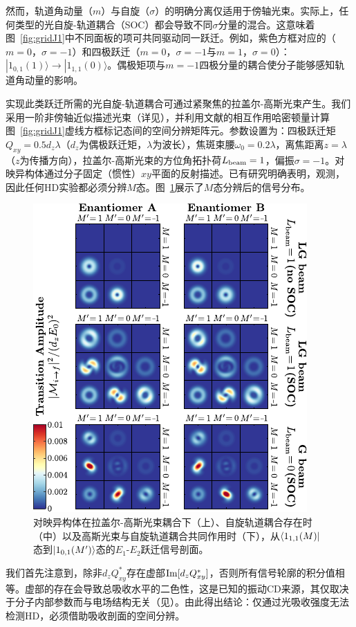 \documentclass[reprint,aps,prl,twocolumn,superscriptaddress,groupedaddress]{revtex4-2}
\newcommand{\eoet}{$E_1$-$E_2$}
\begin{document}
然而，轨道角动量（$m$）与自旋（$\sigma$）的明确分离仅适用于傍轴光束。实际上，任何类型的光自旋-轨道耦合（SOC）都会导致不同$\sigma$分量的混合\cite{Bliokh2015,Bliokh2023}。这意味着图~\ref{fig:gridJ1}中不同面板的项可共同驱动同一跃迁。例如，紫色方框对应的（$m=0$，$\sigma=-1$）和四极跃迁（$m=0$，$\sigma=-1$与$m=1$，$\sigma=0$）：$| 1_{0,1}(1) \rangle \to | 1_{1,1}(0) \rangle$。偶极矩项与$m=-1$四极分量的耦合使分子能够感知轨道角动量的影响。

实现此类跃迁所需的光自旋-轨道耦合可通过紧聚焦的拉盖尔-高斯光束产生\cite{Loeffler2011,Forbes2021nonparaxial,Forbes2021longitudinal}。我们采用一阶非傍轴近似描述光束\cite{Lax1975}（详见\cite{Note1}），并利用文献\cite{Maslov2024,Maslov_Thesis}的相互作用哈密顿量计算图~\ref{fig:gridJ1}虚线方框标记态间的空间分辨矩阵元。参数设置为：四极跃迁矩$Q_{xy}=0.5d_z\lambda$（$d_z$为偶极跃迁矩，$\lambda$为波长），焦斑束腰$\omega_0=0.2\lambda$，离焦距离$z=\lambda$（$z$为传播方向），拉盖尔-高斯光束的方位角拓扑荷$L_{\rm beam}=1$，偏振$\sigma=-1$。对映异构体通过分子固定（惯性）$xy$平面的反射描述。已有研究明确表明\cite{Buckingham1971, Power1975}，观测，因此任何HD实验都必须分辨$M$态。图~\ref{fig:profiles}展示了$M$态分辨后的信号分布。

\begin{figure}[t!]
    \centering
    \includegraphics[width=1.0\columnwidth]{Figure2.pdf}
    \caption{对映异构体在拉盖尔-高斯光束耦合下（上）、自旋轨道耦合存在时（中）以及高斯光束与自旋轨道耦合共同作用时（下），从$\bra{1_{1,1}(M)}$态到$\ket{1_{0,1}(M')}$态的\eoet 跃迁信号剖面。}
    \label{fig:profiles}
\end{figure}
我们首先注意到，除非$d_zQ_{xy}^*$存在虚部${\rm Im}[d_zQ_{xy}^*]$，否则所有信号轮廓的积分值相等。虚部的存在会导致总吸收水平的二色性，这是已知的振动CD来源，其仅取决于分子内部参数而与电场结构无关（见\cite{Buckingham1971}）。由此得出结论：仅通过光吸收强度无法检测HD，必须借助吸收剖面的空间分辨\cite{Loeffler2011}。
\end{document}
